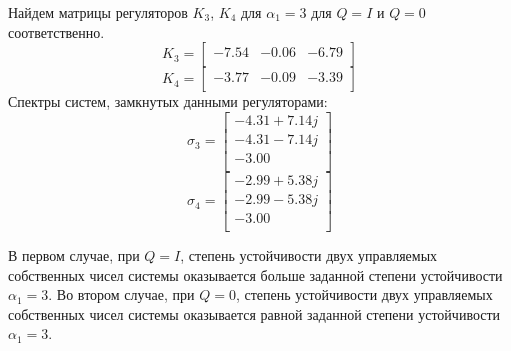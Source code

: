 Найдем матрицы регуляторов $K_3$, $K_4$ для $\alpha_1 = 3$ для $Q = I$ и $Q = 0$ соответственно.
\begin{equation}
    K_3 = \begin{bmatrix}
        -7.54  & -0.06  & -6.79 \\ 
    \end{bmatrix}
\end{equation}
\begin{equation}
    K_4 = \begin{bmatrix}
        -3.77  & -0.09  & -3.39 \\ 
    \end{bmatrix}
\end{equation}
Спектры систем, замкнутых данными регуляторами:
\begin{equation}
    \sigma_3 = \begin{bmatrix}
        -4.31 + 7.14j \\ 
        -4.31 - 7.14j \\ 
        -3.00 \\ 
    \end{bmatrix}
\end{equation}
\begin{equation}
    \sigma_4 = \begin{bmatrix}
        -2.99 + 5.38j \\ 
        -2.99 - 5.38j \\ 
        -3.00 \\ 
    \end{bmatrix}
\end{equation}

В первом случае, при $Q = I$, степень устойчивости двух управляемых собственных чисел системы 
оказывается больше заданной степени устойчивости $\alpha_1 = 3$. Во втором случае, при $Q = 0$,
степень устойчивости двух управляемых собственных чисел системы оказывается равной заданной степени устойчивости $\alpha_1 = 3$.

